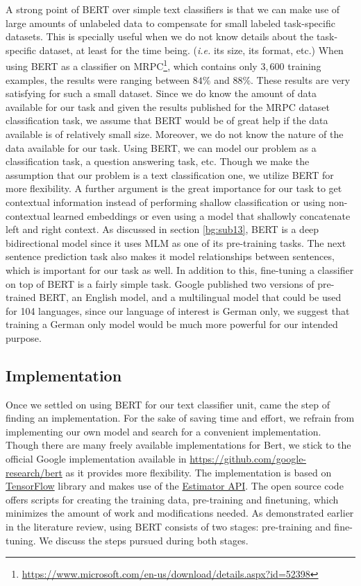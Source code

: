 A strong point of \ac{BERT} over simple text classifiers is that we can make use of large amounts of unlabeled data to compensate for small labeled task-specific datasets. This is specially useful when we do not know details about the task-specific dataset, at least for the time being. (\textit{i.e.} its size, its format, etc.) When using \ac{BERT} as a classifier on \ac{MRPC}\footnote{\url{https://www.microsoft.com/en-us/download/details.aspx?id=52398}}, which contains only $3,600$ training examples, the results were ranging between $84\%$ and $88\%$. These results are very satisfying for such a small dataset. Since we do know the amount of data available for our task and given the results published for the \ac{MRPC} dataset classification task, we assume that \ac{BERT} would be of great help if the data available is of relatively small size. Moreover, we do not know the nature of the data available for our task. Using \ac{BERT}, we can model our problem as a classification task, a question answering task, etc. Though we make the assumption that our problem is a text classification one, we utilize \ac{BERT} for more flexibility. A further argument is the great importance for our task to get contextual information instead of performing shallow classification or using non-contextual learned embeddings or even using a model that shallowly concatenate left and right context. As discussed in section \ref{bg:sub13}, \ac{BERT} is a deep bidirectional model since it uses \acf{MLM} as one of its pre-training tasks. The next sentence prediction task also makes it model relationships between sentences, which is important for our task as well. In addition to this, fine-tuning a classifier on top of \ac{BERT} is a fairly simple task. Google published two versions of pre-trained \ac{BERT}, an English model, and a multilingual model that could be used for 104 languages, since our language of interest is German only, we suggest that training a German only model would be much more powerful for our intended purpose.

\subsection{Implementation}
\label{meth:s5_sub2}

Once we settled on using \ac{BERT} for our text classifier unit, came the step of finding an implementation. For the sake of saving time and effort, we refrain from implementing our own model and search for a convenient implementation. Though there are many freely available implementations for Bert, we stick to the official Google implementation available in \url{https://github.com/google-research/bert} as it provides more flexibility. The implementation is based on \href{https://www.tensorflow.org/}{TensorFlow} library and makes use of the \href{https://www.tensorflow.org/api_docs/python/tf/estimator/Estimator}{Estimator API}. The open source code offers scripts for creating the training data, pre-training and finetuning, which minimizes the amount of work and modifications needed. As demonstrated earlier in the literature review, using \ac{BERT} consists of two stages: pre-training and fine-tuning. We discuss the steps pursued during both stages.

